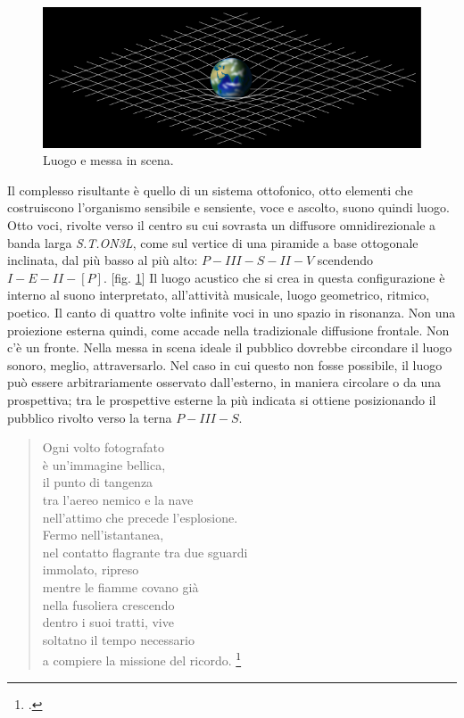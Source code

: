 \begin{figure}[t]
\centering
\includegraphics[width=.47\textwidth]{img/image1.png}
\caption{Luogo e messa in scena.}
\label{luogo}
\end{figure}

Il complesso risultante è quello di un sistema ottofonico, otto elementi che
costruiscono l'organismo sensibile e sensiente, voce e ascolto, suono quindi
luogo. Otto voci, rivolte verso il centro su cui sovrasta un diffusore
omnidirezionale a banda larga \emph{S.T.ON3L}, come sul vertice di una piramide
a base ottogonale inclinata, dal più basso al più alto: $ P-III-S-II-V $ scendendo
$ I-E-II-[P] $. [fig. \ref{luogo}] Il luogo acustico che si crea
in questa configurazione è interno al suono interpretato, all'attività musicale,
luogo geometrico, ritmico, poetico. Il canto di quattro volte infinite voci in
uno spazio in risonanza. Non una proiezione esterna quindi, come accade nella
tradizionale diffusione frontale. Non c'è un fronte. Nella messa in scena ideale
il pubblico dovrebbe circondare il luogo sonoro, meglio, attraversarlo. Nel caso
in cui questo non fosse possibile, il luogo può essere arbitrariamente osservato
dall'esterno, in maniera circolare o da una prospettiva; tra le prospettive
esterne la più indicata si ottiene posizionando il pubblico rivolto verso la
terna $ P-III-S $.

\begin{quote}
Ogni volto fotografato\\
è un'immagine bellica,\\
il punto di tangenza\\
tra l'aereo nemico e la nave\\
nell'attimo che precede l'esplosione.\\
Fermo nell'istantanea,\\
nel contatto flagrante tra due sguardi\\
immolato, ripreso\\
mentre le fiamme covano già\\
nella fusoliera crescendo\\
dentro i suoi tratti, vive\\
soltatno il tempo necessario\\
a compiere la missione del ricordo. \footcite{Magrelli2018}
\end{quote}

